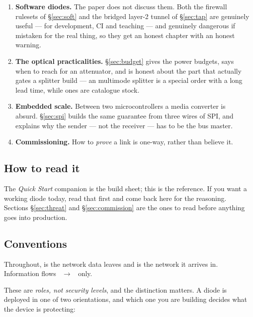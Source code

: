 \documentclass[11pt,a4paper]{article}
\begin{document}
\begin{enumerate}
\item \textbf{Software diodes.} The paper does not discuss them. Both the
      firewall rulesets of \S\ref{sec:soft} and the bridged layer-2 tunnel of
      \S\ref{sec:tap} are genuinely useful --- for development, CI and
      teaching --- and genuinely dangerous if mistaken for the real thing, so
      they get an honest chapter with an honest warning.
\item \textbf{The optical practicalities.} \S\ref{sec:budget} gives the power
      budgets, says when to reach for an attenuator, and is honest about the
      part that actually gates a splitter build --- an  multimode
      splitter is a special order with a long lead time, while  ones
      are catalogue stock.
\item \textbf{Embedded scale.} Between two microcontrollers a media converter
      is absurd. \S\ref{sec:spi} builds the same guarantee from three wires of
      SPI, and explains why the sender --- not the receiver --- has to be the
      bus master.
\item \textbf{Commissioning.} How to \emph{prove} a link is one-way, rather
      than believe it.
\end{enumerate}

\subsection{How to read it}

The \emph{Quick Start} companion is the build sheet; this is the reference.
If you want a working diode today, read that first and come back here for the
reasoning. Sections \S\ref{sec:threat} and \S\ref{sec:commission} are the ones
to read before anything goes into production.

\subsection{Conventions}

Throughout, \srcside{} is the network data leaves and \dstside{} is the
network it arrives in. Information flows
\srcside{}~$\rightarrow$~\dstside{} only.

These are \emph{roles, not security levels}, and the distinction matters. A
diode is deployed in one of two orientations, and which one you are building
decides what the device is protecting:
\end{document}
